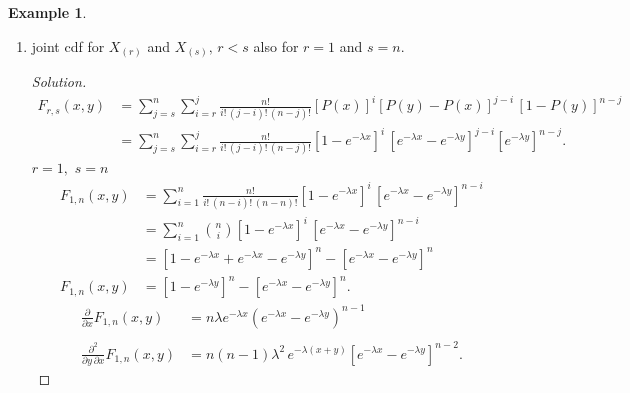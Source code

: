 \documentclass[12pt,a4paper]{report}
\theoremstyle{definition}
\newtheorem{exa}[thm]{Example}
\theoremstyle{plain}
\begin{document}
\begin{exa}
\begin{enumerate}
\item[(iii)] joint cdf for $X_{(r)}$ and $X_{(s)}, \, r < s$ also for $r = 1$ and $s = n$.
\begin{proof}[Solution]
\begin{align*}
F_{r, s}(x,y) &  = \sum^n_{j = s}\sum^j_{i = r}\frac{n!}{i!\, (j- i)!\, (n - j)!}\left[P(x)\right]^i\left[P(y) - P(x)\right]^{j - i}\, \left[1 - P(y)\right]^{n - j}\\
& = \sum^n_{j = s}\sum^j_{i = r}\frac{n!}{i!\, (j - i)!\, (n - j)!}\left[1 - e^{-\lambda x}\right]^i\, \left[e^{-\lambda x} - e^{-\lambda y}\right]^{j - i}\left[e^{-\lambda y}\right]^{n -j}.
\end{align*}
$r = 1, \, \, s = n$
\begin{align*}
F_{1,n}(x,y) & = \sum^n_{i = 1}\frac{n!}{i!\, (n - i)!\, (n - n)!}\left[1 - e^{-\lambda x}\right]^{i}\, \left[e^{-\lambda x} - e^{-\lambda y}\right]^{n - i}\\
& = \sum^n_{i = 1}\binom{n}{i}\left[1 - e^{-\lambda x}\right]^i\, \left[e^{-\lambda x} - e^{-\lambda y}\right]^{n - i}\\
& = \left[1 - e^{-\lambda x} + e^{-\lambda x} - e^{-\lambda y}\right]^n - \left[e^{-\lambda x} - e^{-\lambda y}\right]^n\\
F_{1,n}(x,y) & = \left[1 - e^{-\lambda y}\right]^n - \left[e^{-\lambda x} - e^{-\lambda y}\right]^n.
\end{align*}
\begin{align*}
\frac{\partial}{\partial x}F_{1, n}(x,y)  & = n \lambda e^{-\lambda x}\left(e^{-\lambda x} - e^{-\lambda y}\right)^{n - 1}\\\\
\frac{\partial^2}{\partial y \, \partial x}F_{1,n}(x,y) & = n(n - 1)\lambda^2\, e^{-\lambda(x + y)}\left[e^{-\lambda x} - e^{-\lambda y}\right]^{n - 2}.
\end{align*}
\end{proof}
\end{enumerate}
\end{exa}
\end{document}
